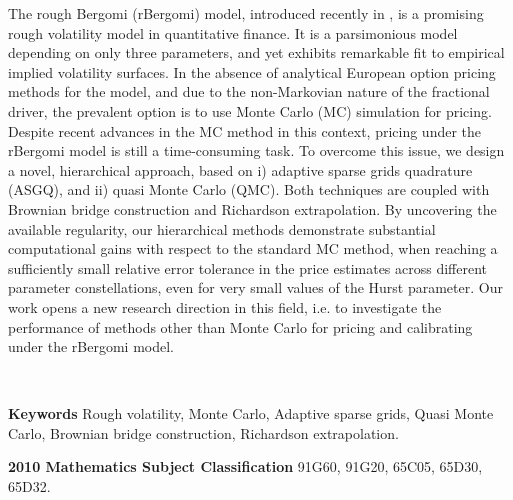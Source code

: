 The rough Bergomi (rBergomi) model, introduced recently in  \cite{bayer2016pricing}, is a promising rough volatility model in quantitative finance. It is a parsimonious model depending on only three parameters, and yet exhibits remarkable fit to empirical implied volatility surfaces. In the absence of analytical European option pricing methods for the model, and due to the non-Markovian nature of the fractional driver, the prevalent option is to use Monte Carlo (MC) simulation for pricing. Despite recent advances in the MC method in this context, pricing under the rBergomi model is still a time-consuming task. To overcome this issue, we design a novel,  hierarchical approach, based on i) adaptive sparse grids quadrature (ASGQ), and ii) quasi Monte Carlo (QMC). Both techniques are coupled with Brownian bridge construction and Richardson extrapolation. By uncovering the available regularity,  our hierarchical methods demonstrate substantial computational gains with respect to the standard MC method, when reaching a sufficiently small relative error tolerance in the price estimates across different parameter constellations, even for very small values of the Hurst  parameter. Our work opens a new research direction in this field, i.e.\red{,} to investigate the performance of  methods  other than Monte Carlo for pricing and calibrating under the rBergomi model.

\

\textbf{Keywords} Rough volatility, Monte Carlo, Adaptive sparse grids, Quasi Monte Carlo, Brownian bridge construction, Richardson extrapolation.

\textbf{2010 Mathematics Subject Classification} 	91G60, 	91G20, 65C05, 65D30, 65D32.